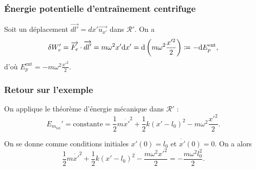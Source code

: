         \subsubsection{Énergie potentielle d'entraînement \og centrifuge\fg}
            
            Soit un déplacement $\vec{dl'}=dx'\vec{u_{x'}}$ dans $\mathcal{R}'$. On a 
            \begin{equation}
                \delta W_{e}'=\protect\overrightarrow{{F_e}}\cdot\protect\overrightarrow{{dl'}}=m\omega^{2}x'\mathrm{d} x'=\mathrm{d}\left(m\omega^{2}\frac{x'^{2}}{2}\right)\coloneqq -\mathrm{d} E_p^{\text{ent}},
            \end{equation}
            d'où $E_p^{\text{ent}}=-m\omega^{2}\frac{x'^{2}}{2}$.

        \subsubsection{Retour sur l'exemple}

            On applique le théorème d'énergie mécanique dans $\mathcal{R}'$ :
            \begin{equation}
                E_{m_{tot}}'=\text{constante}=\frac{1}{2}m\dot{x'}^{2}+\frac{1}{2}k(x'-l_0)^{2}-m\omega^{2}\frac{x'^{2}}{2}.
            \end{equation}

            On se donne comme conditions initiales $x'(0)=l_0$ et $\dot{x'}(0)=0$. On a alors 
            \begin{equation}
                \boxed{
                    \frac{1}{2}m\dot{x'}^{2}+\frac{1}{2}k(x'-l_0)^{2}-\frac{m\omega^{2}x'^{2}}{2}=-\frac{m\omega^{2}l_0^{2}}{2}.
                }
            \end{equation}
